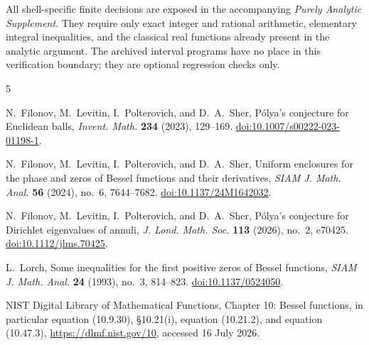 \documentclass[11pt]{article}
\numberwithin{equation}{section}
\theoremstyle{definition}
\theoremstyle{remark}
\begin{document}
All shell-specific finite decisions are exposed in the accompanying
\emph{Purely Analytic Supplement}.  They require only exact integer and
rational arithmetic, elementary integral inequalities, and the classical
real functions already present in the analytic argument.  The archived
interval programs have no place in this verification boundary; they are
optional regression checks only.

\begin{thebibliography}{5}

N.~Filonov, M.~Levitin, I.~Polterovich, and D.~A.~Sher,
\newblock P\'olya's conjecture for Euclidean balls,
\newblock \emph{Invent. Math.} \textbf{234} (2023), 129--169.
\newblock \href{https://doi.org/10.1007/s00222-023-01198-1}{doi:10.1007/s00222-023-01198-1}.

N.~Filonov, M.~Levitin, I.~Polterovich, and D.~A.~Sher,
\newblock Uniform enclosures for the phase and zeros of Bessel functions and
their derivatives,
\newblock \emph{SIAM J. Math. Anal.} \textbf{56} (2024), no.~6, 7644--7682.
\newblock \href{https://doi.org/10.1137/24M1642032}{doi:10.1137/24M1642032}.

N.~Filonov, M.~Levitin, I.~Polterovich, and D.~A.~Sher,
\newblock P\'olya's conjecture for Dirichlet eigenvalues of annuli,
\newblock \emph{J. Lond. Math. Soc.} \textbf{113} (2026), no.~2, e70425.
\newblock \href{https://doi.org/10.1112/jlms.70425}{doi:10.1112/jlms.70425}.

L.~Lorch,
\newblock Some inequalities for the first positive zeros of Bessel
functions,
\newblock \emph{SIAM J. Math. Anal.} \textbf{24} (1993), no.~3, 814--823.
\newblock \href{https://doi.org/10.1137/0524050}{doi:10.1137/0524050}.

NIST Digital Library of Mathematical Functions,
\newblock Chapter 10: Bessel functions, in particular equation (10.9.30),
\S10.21(i), equation (10.21.2), and equation (10.47.3),
\newblock \url{https://dlmf.nist.gov/10}, accessed 16 July 2026.

\end{thebibliography}
\end{document}
